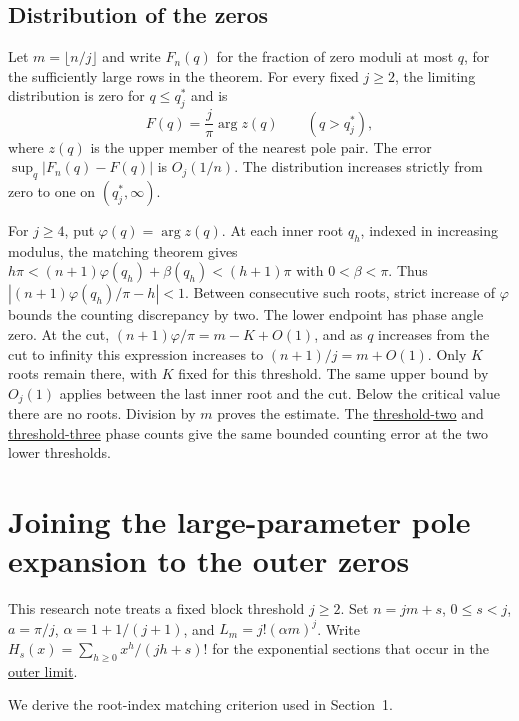 \documentclass[11pt]{article}
\begin{document}
\subsection{Distribution of the zeros}

Let $m=\lfloor n/j\rfloor$ and write $F_n(q)$ for the fraction of zero moduli at most $q$, for the sufficiently large rows in the theorem. For every fixed $j\ge2$, the limiting distribution is zero for $q\le q_j^*$ and is
\[
F(q)=\frac{j}{\pi}\arg z(q)\qquad(q>q_j^*),
\]
where $z(q)$ is the upper member of the nearest pole pair. The error $\sup_q|F_n(q)-F(q)|$ is $O_j(1/n)$. The distribution increases strictly from zero to one on $(q_j^*,\infty)$.

For $j\ge4$, put $\varphi(q)=\arg z(q)$. At each inner root $q_h$, indexed in increasing modulus, the matching theorem gives $h\pi<(n+1)\varphi(q_h)+\beta(q_h)<(h+1)\pi$ with $0<\beta<\pi$. Thus $|(n+1)\varphi(q_h)/\pi-h|<1$. Between consecutive such roots, strict increase of $\varphi$ bounds the counting discrepancy by two. The lower endpoint has phase angle zero. At the cut, $(n+1)\varphi/\pi=m-K+O(1)$, and as $q$ increases from the cut to infinity this expression increases to $(n+1)/j=m+O(1)$. Only $K$ roots remain there, with $K$ fixed for this threshold. The same upper bound by $O_j(1)$ applies between the last inner root and the cut. Below the critical value there are no roots. Division by $m$ proves the estimate. The \href{https://github.com/ProgramComputer/open-math-research/blob/main/topics/ordered-large-blocks/root-law.md}{threshold-two} and \href{https://github.com/ProgramComputer/open-math-research/blob/main/topics/ordered-large-blocks/threshold-three-root-law.md}{threshold-three} phase counts give the same bounded counting error at the two lower thresholds.

\section{Joining the large-parameter pole expansion to the outer zeros}

This research note treats a fixed block threshold $j\ge2$. Set $n=jm+s$, $0\le s<j$, $a=\pi/j$, $\alpha=1+1/(j+1)$, and $L_m=j!(\alpha m)^j$. Write $H_s(x)=\sum_{h\ge0}x^h/(jh+s)!$ for the exponential sections that occur in the \href{https://github.com/ProgramComputer/open-math-research/blob/main/topics/ordered-large-blocks/fixed-threshold-outer-zeros.md}{outer limit}.

We derive the root-index matching criterion used in Section~1.
\end{document}
